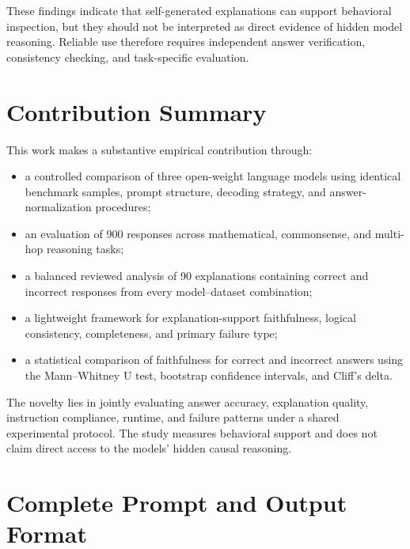 \documentclass{article}
\begin{document}
These findings indicate that self-generated explanations can support
behavioral inspection, but they should not be interpreted as direct
evidence of hidden model reasoning. Reliable use therefore requires
independent answer verification, consistency checking, and
task-specific evaluation.


\clearpage
\printbibliography[title={References}]



\clearpage
\appendix

\section{Contribution Summary}
\label{app:contribution}

This work makes a substantive empirical contribution through:

\begin{itemize}
    \item a controlled comparison of three open-weight language models
    using identical benchmark samples, prompt structure, decoding
    strategy, and answer-normalization procedures;

    \item an evaluation of 900 responses across mathematical,
    commonsense, and multi-hop reasoning tasks;

    \item a balanced reviewed analysis of 90 explanations containing
    correct and incorrect responses from every model--dataset
    combination;

    \item a lightweight framework for explanation-support faithfulness,
    logical consistency, completeness, and primary failure type;

    \item a statistical comparison of faithfulness for correct and
    incorrect answers using the Mann--Whitney U test, bootstrap
    confidence intervals, and Cliff's delta.
\end{itemize}

The novelty lies in jointly evaluating answer accuracy, explanation
quality, instruction compliance, runtime, and failure patterns under a
shared experimental protocol. The study measures behavioral support and
does not claim direct access to the models' hidden causal reasoning.


\section{Complete Prompt and Output Format}
\label{app:prompt}
\end{document}
